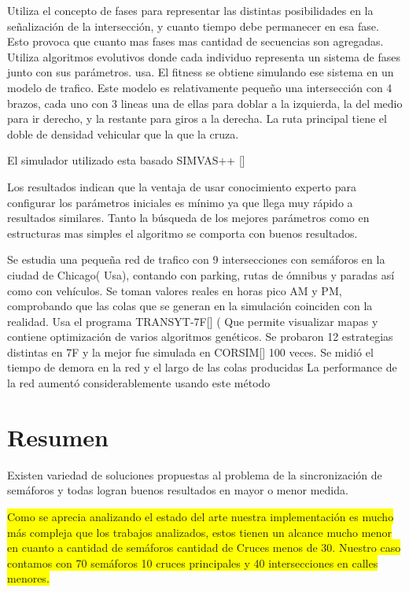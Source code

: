 \begin{itemize}
\begin{item}
Utiliza el concepto de fases para representar las distintas posibilidades en la señalización de la intersección, y cuanto tiempo debe permanecer en esa fase. Esto provoca que cuanto mas fases mas cantidad de secuencias son agregadas.
Utiliza algoritmos evolutivos donde cada individuo representa un sistema de fases junto con sus parámetros. usa. El fitness se obtiene simulando ese sistema en un modelo de trafico. Este modelo es relativamente pequeño una intersección con 4 brazos, cada uno con 3 lineas una de ellas para doblar a la izquierda, la del medio para ir derecho, y la restante para giros a la derecha. La ruta principal tiene el doble de densidad vehicular que la que la cruza.

El simulador utilizado esta basado SIMVAS++ []

Los resultados indican que la ventaja de usar conocimiento experto para configurar los parámetros iniciales es mínimo ya que llega muy rápido a resultados similares. Tanto la búsqueda de los mejores parámetros como en estructuras mas simples el algoritmo se comporta con buenos resultados.
		
	\end{item}	
	
	\begin{item}

Se estudia una pequeña red de trafico con 9 intersecciones con semáforos en la ciudad de Chicago( Usa), contando con parking, rutas de ómnibus y paradas así como con vehículos.  
Se toman valores reales en horas pico AM y PM, comprobando que las colas que se generan en la simulación coinciden con la realidad.
Usa el programa TRANSYT-7F[] ( Que permite visualizar mapas y contiene optimización de varios algoritmos genéticos.
Se probaron 12 estrategias distintas en 7F y la mejor fue simulada en CORSIM[] 100 veces. Se midió el tiempo de demora en la red y el largo de las colas producidas
La performance de la red aumentó considerablemente usando este método	
	\end{item}	

\end{itemize}


\section{Resumen}
Existen variedad de soluciones propuestas al problema de la sincronización de semáforos y todas logran buenos resultados en mayor o menor medida.

\colorbox{yellow}{
Como se aprecia analizando el estado del arte nuestra implementación es mucho más compleja  que los trabajos analizados, estos tienen un alcance mucho menor en cuanto a cantidad de semáforos cantidad de Cruces menos de 30. Nuestro caso contamos con 70 semáforos 10 cruces principales y 40 intersecciones en calles menores.}